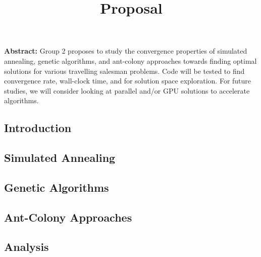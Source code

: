\documentclass{article}
\begin{document}
\title{Proposal}
\textbf{Abstract:} Group 2 proposes to study the convergence
properties of simulated annealing, genetic algorithms, and ant-colony approaches towards
finding optimal solutions for various travelling salesman problems.  Code will be tested
to find convergence rate, wall-clock time, and for solution space exploration.  For future studies,
we will consider looking at parallel and/or GPU solutions to accelerate algorithms.
\subsection{Introduction}
\subsection{Simulated Annealing}
\subsection{Genetic Algorithms}
\subsection{Ant-Colony Approaches}
\subsection{Analysis}

\end{document}
